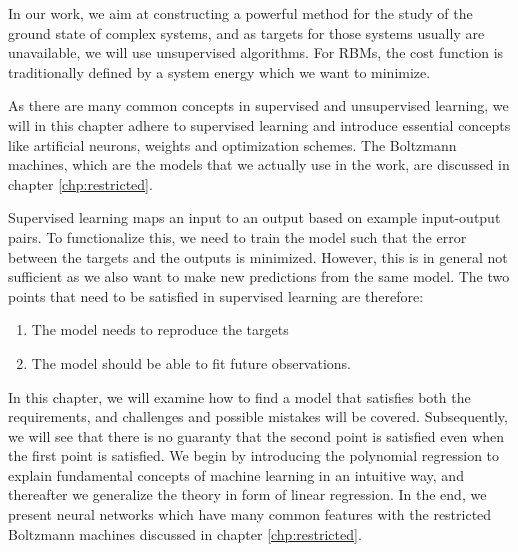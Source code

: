 In our work, we aim at constructing a powerful method for the study of the ground state of complex systems, and as targets for those systems usually are unavailable, we will use unsupervised algorithms. For RBMs, the cost function is traditionally defined by a system energy which we want to minimize. 

As there are many common concepts in supervised and unsupervised learning, we will in this chapter adhere to supervised learning and introduce essential concepts like artificial neurons, weights and optimization schemes. The Boltzmann machines, which are the models that we actually use in the work, are discussed in chapter \ref{chp:restricted}.

Supervised learning maps an input to an output based on example input-output pairs. To functionalize this, we need to train the model such that the error between the targets and the outputs is minimized. However, this is in general not sufficient as we also want to make new predictions from the same model. The two points that need to be satisfied in supervised learning are therefore:
\begin{enumerate}
	\item The model needs to reproduce the targets
	\item The model should be able to fit future observations.
\end{enumerate}
In this chapter, we will examine how to find a model that satisfies both the requirements, and challenges and possible mistakes will be covered. Subsequently, we will see that there is no guaranty that the second point is satisfied even when the first point is satisfied. We begin by introducing the polynomial regression to explain fundamental concepts of machine learning in an intuitive way, and thereafter we generalize the theory in form of linear regression. In the end, we present neural networks which have many common features with the restricted Boltzmann machines discussed in chapter \ref{chp:restricted}. 

